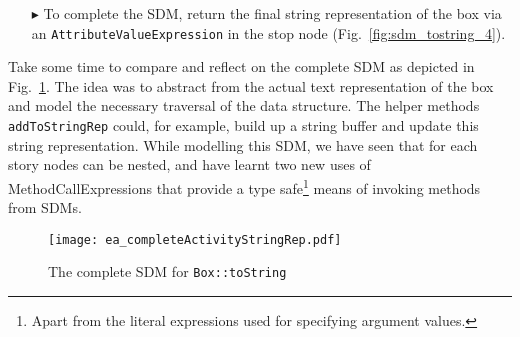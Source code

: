 \begin{itemize}
\item[$\blacktriangleright$] To complete the SDM, return the final string representation of the box via an \texttt{AttributeValueExpression} in the stop node
(Fig.~\ref{fig:sdm_tostring_4}).
\end{itemize}



Take some time to compare and reflect on the complete SDM as depicted in Fig.~\ref{fig:sdm_tostring_5}.  The idea was to abstract from the actual text
representation of the box and model the necessary traversal of the data structure. The helper methods \texttt{addToStringRep} could, for example, build up a
string buffer and update this string representation. While modelling this SDM, we have seen that for each story nodes can be nested, and have learnt two new
uses of MethodCallExpressions that provide a type safe\footnote{Apart from the literal expressions used for specifying argument values.} means of invoking
methods from SDMs.

\begin{figure}[htbp]
\begin{center}
  \texttt{[image: ea\_completeActivityStringRep.pdf]}
  \caption{The complete SDM for \texttt{Box::toString}}  
  \label{fig:sdm_tostring_5}
\end{center}
\end{figure}
\FloatBarrier

